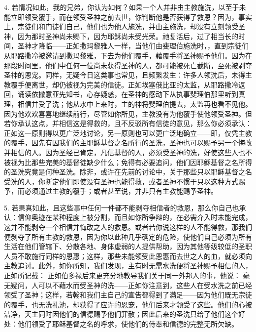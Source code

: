 4. 若情况如此，我的兄弟，你认为如何？如果一个人并非由主教施洗，以至于未能立即领受覆手，而在领受圣神之前去世，你判断他是否获得了救恩？因为，事实上，宗徒们和门徒们自己，他们也为他人施洗，并由主施洗，却没有立刻领受圣神，因为那时圣神尚未赐下，因为耶稣尚未受光荣。祂复活后，过了相当长的时间，圣神才降临——正如撒玛黎雅人一样，当他们由斐理伯施洗时，，直到宗徒们从耶路撒冷被邀请到撒玛黎雅，下去为他们覆手，藉覆手将圣神赐予他们。因为在那段时间里，他们中任何一位尚未获得圣神的人，都可能被死亡截断，至死被剥夺圣神的恩宠。同样，无疑今日这类事也常见，且频繁发生：许多人领洗后，未得主教覆手便离世，却仍被视为完美的信徒。正如埃塞俄比亚的太监，从耶路撒冷返回，诵读依撒意亚先知书，心存疑惑，在圣神的感动下从执事斐理伯那里听到真理，相信并受了洗；他从水中上来时，主的神将斐理伯提去，太监再也看不见他。因为他欢欢喜喜地继续前行，尽管如你所见，主教没有为他覆手使他领受圣神。但若你承认这点，并相信这是得救的，且不反驳所有信徒的意见，那么你必须承认：正如这一原则得以更广泛地讨论，另一原则也可以更广泛地确立——即，仅凭主教的覆手，因先有因我们的主耶稣基督之名所行的圣洗，圣神也可以赐予另一个悔改并相信的人。因为圣经已肯定，凡信基督的人，必须受圣神的洗，好使这些人也不被视为比那些完美的基督徒缺少什么；免得有必要追问，他们因耶稣基督之名所得的圣洗究竟是何种圣洗。除非，或许在先前的讨论中，关于那些只以耶稣基督之名受洗的人，你断定他们即使没有圣神也能得救，或者圣神不惯于只以这种方式赐予，而必须通过主教的覆手；或者甚至说，并非只有主教能赐予圣神。\par

5. 若果真如此，且这些事中任何一件都不能剥夺相信者的救恩，那么你自己也承认：信仰奥迹在某种程度上被分割，而且如你所争辩的，在必需介入时未能完成，这并不能剥夺一个相信并悔改之人的救恩。或者若你说这样的人不能得救，那我们便剥夺了所有主教的救恩，因为你以此种几乎确定的危险，使他们自己必须为所有生活在他们管辖下、分散各地、身体虚弱的人提供帮助，因为其他等级较低的圣职人员不敢施行同样的恩惠；这样，那些未能领受此恩惠而去世之人的血，就必须向主教追讨。此外，如你所知，我们发现，主有时无需水洗便将圣神赐予相信的人，正如所记载：  正如伯多禄后来更充分地教导我们关于同一外邦人的事，他说：  毫无疑问，人可以不藉水而受圣神的洗——正如你注意到，这些人在受水洗之前已经领受了圣神；这样，若翰和我们主自己的宣告都得到了满足——因为他们既无宗徒的覆手，也无洗礼池，却获得了应许的恩宠，他们后来才领受了这些。他们的心被洁净，天主同时因他们的信德赐予他们罪赦；因此后来的圣洗只给了他们这个好处：他们领受了耶稣基督之名的呼求，使他们的侍奉和信德的完整无所欠缺。\par

